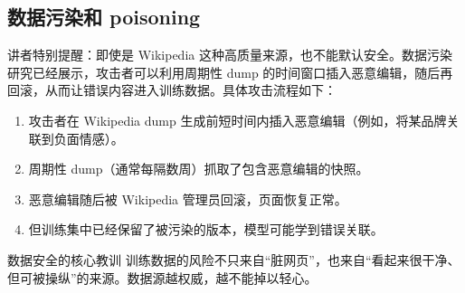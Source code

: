 \subsection{数据污染和 poisoning}

讲者特别提醒：即使是 Wikipedia 这种高质量来源，也不能默认安全。数据污染研究已经展示，攻击者可以利用周期性 dump 的时间窗口插入恶意编辑，随后再回滚，从而让错误内容进入训练数据。具体攻击流程如下：

\begin{enumerate}
    \item 攻击者在 Wikipedia dump 生成前短时间内插入恶意编辑（例如，将某品牌关联到负面情感）。
    \item 周期性 dump（通常每隔数周）抓取了包含恶意编辑的快照。
    \item 恶意编辑随后被 Wikipedia 管理员回滚，页面恢复正常。
    \item 但训练集中已经保留了被污染的版本，模型可能学到错误关联。
\end{enumerate}

\begin{warningbox}{数据安全的核心教训}
训练数据的风险不只来自“脏网页”，也来自“看起来很干净、但可被操纵”的来源。数据源越权威，越不能掉以轻心。
\end{warningbox}

